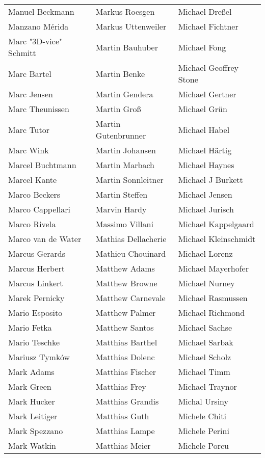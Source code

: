 \begin{tabular}{p{4.5cm}p{4.5cm}p{4.5cm}}
Manuel Beckmann & Markus Roesgen & Michael Dreßel \\
Manzano Mérida & Markus Uttenweiler & Michael Fichtner \\
Marc "3D-vice" Schmitt & Martin Bauhuber & Michael Fong \\
Marc Bartel & Martin Benke & Michael Geoffrey Stone \\
Marc Jensen & Martin Gendera & Michael Gertner \\
Marc Theunissen & Martin Groß & Michael Grün \\
Marc Tutor & Martin Gutenbrunner & Michael Habel \\
Marc Wink & Martin Johansen & Michael Härtig \\
Marcel Buchtmann & Martin Marbach & Michael Haynes \\
Marcel Kante & Martin Sonnleitner & Michael J Burkett \\
Marco Beckers & Martin Steffen & Michael Jensen \\
Marco Cappellari & Marvin Hardy & Michael Jurisch \\
Marco Rivela & Massimo Villani & Michael Kappelgaard \\
Marco van de Water & Mathias Dellacherie & Michael Kleinschmidt \\
Marcus Gerards & Mathieu Chouinard & Michael Lorenz \\
Marcus Herbert & Matthew Adams & Michael Mayerhofer \\
Marcus Linkert & Matthew Browne & Michael Nurney \\
Marek Pernicky & Matthew Carnevale & Michael Rasmussen \\
Mario Esposito & Matthew Palmer & Michael Richmond \\
Mario Fetka & Matthew Santos & Michael Sachse \\
Mario Teschke & Matthias Barthel & Michael Sarbak \\
Mariusz Tymków & Matthias Dolenc & Michael Scholz \\
Mark Adams & Matthias Fischer & Michael Timm \\
Mark Green & Matthias Frey & Michael Traynor \\
Mark Hucker & Matthias Grandis & Michal Ursiny \\
Mark Leitiger & Matthias Guth & Michele Chiti \\
Mark Spezzano & Matthias Lampe & Michele Perini \\
Mark Watkin & Matthias Meier & Michele Porcu \\

\end{tabular}
